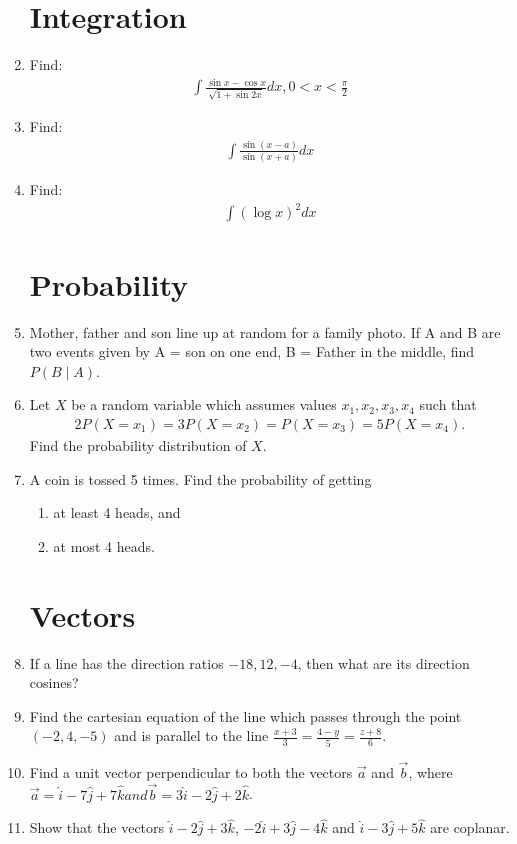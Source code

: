 \documentclass[10pt,-letter paper]{article}
\providecommand{\brak}[1]{\ensuremath{\left(#1\right)}}
\begin{document}
\begin{enumerate}
\section{Integration}
\item Find: 
	\begin{align*}
		\int\frac{\sin x-\cos x}{\sqrt{1+\sin 2x}}dx, 0<x<\frac{\pi}{2}
	\end{align*}
\item Find: 
	\begin{align*}
		\int\frac{\sin\brak{x-a}}{\sin\brak{x+a}}dx
	\end{align*}
\item Find:
	\begin{align*}
	\int\brak{\log{x}}^2dx
        \end{align*}
\section{Probability}
\item Mother, father and son line up at random for a family photo. If A and B are two events given by A = son on one end, B = Father in the middle, find $P(B\mid A)$.
\item Let ${X}$ be a random variable which assumes values ${x_1},{x_2},{x_3},{x_4}$ such that
	\begin{align*}
2P\brak{X = x_1} = 3P\brak{X = x_2} = P\brak{X = x_3} = 5P\brak{X = x_4}.
	\end{align*}
Find the probability distribution of ${X}$.
\item A coin is tossed 5 times. Find the probability of getting 
	\begin{enumerate}[label = (\roman*)]
		\item at least 4 heads, and 
		\item at most 4 heads.
	\end{enumerate}
\section{Vectors}
\item If a line has the direction ratios ${-18,12,-4}$, then what are its direction cosines?
\item Find the cartesian equation of the line which passes through the point $\brak{-2,4,-5}$ and is parallel to the line $\frac{{x} + {3}}{3} = \frac{{4} - {y}}{5} = \frac{{z} + {8}}{6}$.
\item Find a unit vector perpendicular to both the vectors $\overrightarrow{a}$ and $\overrightarrow{b}$, where $\overrightarrow{a} = \hat{i} - 7\hat{j} + 7\hat{k} and \overrightarrow{b} = 3\hat{i} - 2\hat{j} + 2\hat{k}$.
\item Show that the vectors $\hat{i}-2\hat{j} +3\hat{k}$, $-2\hat{i}+3\hat{j}-4\hat{k}$ and $\hat{i}-3\hat{j}+5\hat{k}$ are coplanar.

\end{enumerate}
\end{document}
